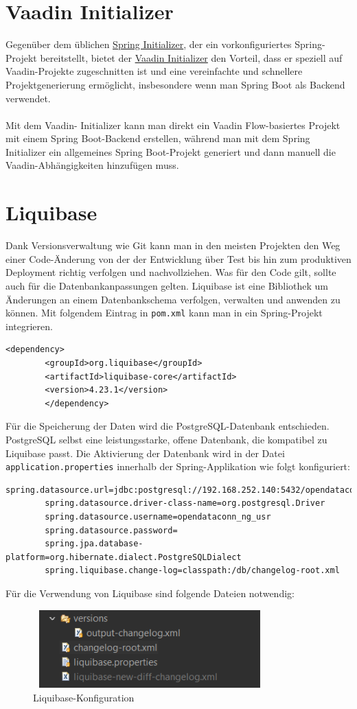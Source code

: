 \documentclass[a4paper,12pt]{scrreprt}
\begin{document}
	\section{Vaadin Initializer}
	Gegenüber dem üblichen \href{https://start.spring.io/} {Spring Initializer}, der ein vorkonfiguriertes Spring-Projekt bereitstellt, bietet der \href{https://start.vaadin.com/app/p} {Vaadin Initializer} den Vorteil, dass er speziell auf Vaadin-Projekte zugeschnitten ist und eine vereinfachte und schnellere Projektgenerierung ermöglicht, insbesondere wenn man Spring Boot als Backend verwendet.\\ \\ Mit dem Vaadin- Initializer kann man direkt ein Vaadin Flow-basiertes Projekt mit einem Spring Boot-Backend erstellen, während man mit dem Spring Initializer ein allgemeines Spring Boot-Projekt generiert und dann manuell die Vaadin-Abhängigkeiten hinzufügen muss.
	
	\section{Liquibase}
	Dank Versionsverwaltung wie Git kann man in den meisten Projekten den Weg einer Code-Änderung von der der Entwicklung über Test bis hin zum produktiven Deployment richtig verfolgen und nachvollziehen. Was für den Code gilt, sollte auch für die Datenbankanpassungen gelten. Liquibase ist eine Bibliothek um Änderungen an einem Datenbankschema verfolgen, verwalten und anwenden zu können. Mit folgendem Eintrag in \texttt{pom.xml} kann man in ein Spring-Projekt integrieren.
	\begin{lstlisting}[language=POM]
		<dependency>
		<groupId>org.liquibase</groupId>
		<artifactId>liquibase-core</artifactId>
		<version>4.23.1</version>
		</dependency>
	\end{lstlisting}
	Für die Speicherung der Daten wird die PostgreSQL-Datenbank entschieden. PostgreSQL selbst eine leistungsstarke, offene Datenbank, die kompatibel zu Liquibase passt. Die Aktivierung der Datenbank wird in der Datei \texttt{application.properties} innerhalb der Spring-Applikation wie folgt konfiguriert:
	\begin{lstlisting}[language=properties]
		spring.datasource.url=jdbc:postgresql://192.168.252.140:5432/opendataconn_ng
		spring.datasource.driver-class-name=org.postgresql.Driver
		spring.datasource.username=opendataconn_ng_usr
		spring.datasource.password=
		spring.jpa.database-platform=org.hibernate.dialect.PostgreSQLDialect
		spring.liquibase.change-log=classpath:/db/changelog-root.xml
	\end{lstlisting}
	Für die Verwendung von Liquibase sind folgende Dateien notwendig:
	\begin{figure}[h!]
		\centering
		\includegraphics[width=9cm, height=3cm]{liquibase-changelog.png}
		\caption{\label{datenbank:konfiguration} Liquibase-Konfiguration}
	\end{figure}
\end{document}
